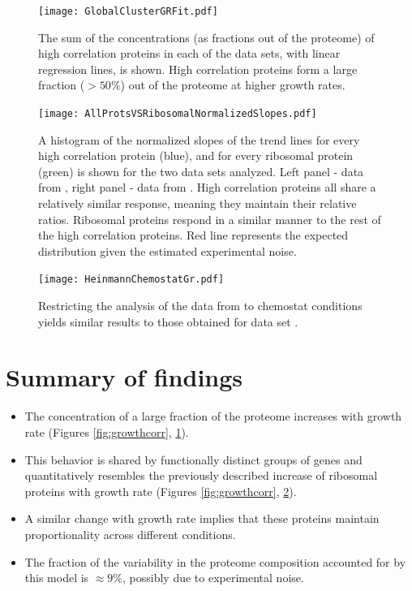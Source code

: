 \documentclass[a4paper,landscape,17pt]{extarticle}
\begin{document}
\begin{figure}[h]
\centering
\texttt{[image: GlobalClusterGRFit.pdf]}
\caption{\linespread{0.5}\selectfont{}
The sum of the concentrations (as fractions out of the proteome) of high correlation proteins in each of the data sets, with linear regression lines, is shown.
High correlation proteins form a large fraction  ($>50\%$) out of the proteome at higher growth rates.
}

\label{fig:globalgrcorr}
\end{figure}
\clearpage        
\begin{figure}[h]
\centering
\texttt{[image: AllProtsVSRibosomalNormalizedSlopes.pdf]}
\caption{\linespread{0.5}\selectfont{}
    A histogram of the normalized slopes of the trend lines for every high correlation protein (blue), and for every ribosomal protein (green) is shown for the two data sets analyzed.
    Left panel - data from \parencite{Heinemann2014}, right panel - data from \parencite{Valgepea2013}.
    High correlation proteins all share a relatively similar response, meaning they maintain their relative ratios.
    Ribosomal proteins respond in a similar manner to the rest of the high correlation proteins.
    Red line represents the expected distribution given the estimated experimental noise.
}
\label{fig:globalfit}
\end{figure}
\clearpage        

\begin{figure}[h]
\centering
\texttt{[image: HeinmannChemostatGr.pdf]}
\caption{\linespread{0.5}\selectfont{}
  Restricting the analysis of the data from \cite{Heinemann2014} to chemostat conditions yields similar results to those obtained for data set \parencite{Valgepea2013}.
}
\label{fig:growthcorrchemo}
\end{figure}
\clearpage        

\section*{Summary of findings}
\begin{itemize}
\item The concentration of a large fraction of the proteome increases with growth rate (Figures \ref{fig:growthcorr}, \ref{fig:globalgrcorr}).
\item This behavior is shared by functionally distinct groups of genes and quantitatively resembles the previously described increase of ribosomal proteins with growth rate (Figures \ref{fig:growthcorr}, \ref{fig:globalfit}).
\item A similar change with growth rate implies that these proteins maintain proportionality across different conditions.
\item The fraction of the variability in the proteome composition accounted for by this model is $\approx 9\%$, possibly due to experimental noise.
\end{itemize}
\end{document}
